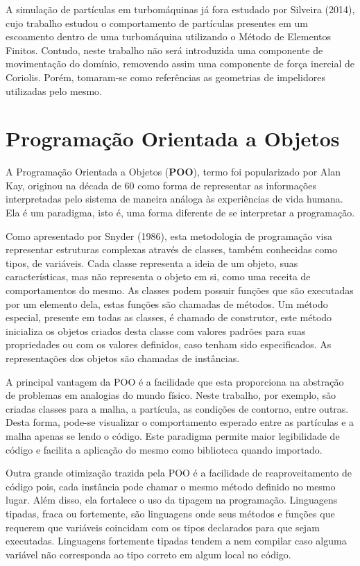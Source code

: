 A simulação de partículas em turbomáquinas já fora estudado por Silveira (2014)\cite{silveira}, cujo trabalho estudou o comportamento de partículas presentes em um escoamento dentro de uma turbomáquina utilizando o Método de Elementos Finitos.
Contudo, neste trabalho não será introduzida uma componente de movimentação do domínio, removendo assim uma componente de força inercial de Coriolis.
Porém, tomaram-se como referências as geometrias de impelidores utilizadas pelo mesmo.


\section{\textbf{Programação Orientada a Objetos}}
\label{sec_rev_POO}
A Programação Orientada a Objetos (\textbf{POO}), termo foi popularizado por Alan Kay, originou na década de 60 como forma de representar as informações interpretadas pelo sistema de maneira análoga às experiências de vida humana.
Ela é um paradigma, isto é, uma forma diferente de se interpretar a programação.

Como apresentado por Snyder (1986)\cite{Snyder-1986}, esta metodologia de programação visa representar estruturas complexas através de classes, também conhecidas como tipos, de variáveis.
Cada classe representa a ideia de um objeto, suas características, mas não representa o objeto em si, como uma receita de comportamentos do mesmo.
As classes podem possuir funções que são executadas por um elemento dela, estas funções são chamadas de métodos.
Um método especial, presente em todas as classes, é chamado de construtor, este método inicializa os objetos criados desta classe com valores padrões para suas propriedades ou com os valores definidos, caso tenham sido especificados.
As representações dos objetos são chamadas de instâncias.

A principal vantagem da POO é a facilidade que esta proporciona na abstração de problemas em analogias do mundo físico.
Neste trabalho, por exemplo, são criadas classes para a malha, a partícula, as condições de contorno, entre outras.
Desta forma, pode-se visualizar o comportamento esperado entre as partículas e a malha apenas se lendo o código.
Este paradigma permite maior legibilidade de código e facilita a aplicação do mesmo como biblioteca quando importado.

Outra grande otimização trazida pela POO é a facilidade de reaproveitamento de código pois, cada instância pode chamar o mesmo método definido no mesmo lugar.
Além disso, ela fortalece o uso da tipagem na programação.
Linguagens tipadas, fraca ou fortemente, são linguagens onde seus métodos e funções que requerem que variáveis coincidam com os tipos declarados para que sejam executadas.
Linguagens fortemente tipadas tendem a nem compilar caso alguma variável não corresponda ao tipo correto em algum local no código.

